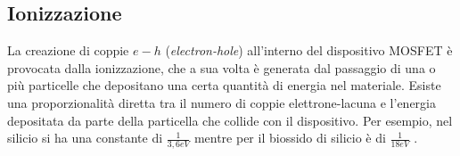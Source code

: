 \vspace{0.5cm}

\subsection{Ionizzazione}\label{cap1:ionizzazione}
La creazione di coppie $e-h$ (\textit{electron-hole}) all'interno del dispositivo MOSFET è provocata dalla ionizzazione, che a sua volta è generata dal passaggio di una o più particelle che depositano una certa quantità di energia nel materiale. Esiste una proporzionalità diretta tra il numero di coppie elettrone-lacuna e l'energia depositata da parte della particella che collide con il dispositivo. Per esempio, nel silicio si ha una constante di $\frac{1}{3,6eV}$ mentre per il biossido di silicio è di $\frac{1}{18eV}$ \cite{bib:Effetti_Radiazioni_NASA}.





\vspace{0.5cm}

